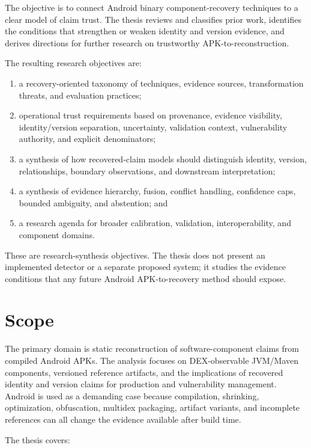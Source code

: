 The objective is to connect Android binary component-recovery techniques to a
clear model of claim trust. The thesis reviews and classifies prior work,
identifies the conditions that strengthen or weaken identity and version
evidence, and derives directions for further research on trustworthy
APK-to-\SBOM reconstruction.

The resulting research objectives are:

\begin{enumerate}
  \item a recovery-oriented taxonomy of techniques, evidence sources,
  transformation threats, and evaluation practices;
  \item operational trust requirements based on provenance, evidence
  visibility, identity/version separation, uncertainty, validation context,
  vulnerability authority, and explicit denominators;
  \item a synthesis of how recovered-claim models should distinguish
  identity, version, relationships, boundary observations, and downstream
  interpretation;
  \item a synthesis of evidence hierarchy, fusion, conflict handling,
  confidence caps, bounded ambiguity, and abstention; and
  \item a research agenda for broader calibration, validation,
  interoperability, and component domains.
\end{enumerate}

These are research-synthesis objectives. The thesis does not present an
implemented detector or a separate proposed system; it studies the evidence
conditions that any future Android APK-to-\SBOM recovery method should expose.

\section{Scope}

The primary domain is static reconstruction of software-component claims from
compiled Android APKs. The analysis focuses on DEX-observable JVM/Maven
components, versioned reference artifacts, and the implications of recovered
identity and version claims for \SBOM production and vulnerability
management. Android is used as a demanding case because compilation,
shrinking, optimization, obfuscation, multidex packaging, artifact variants,
and incomplete references can all change the evidence available after build
time.

The thesis covers:

